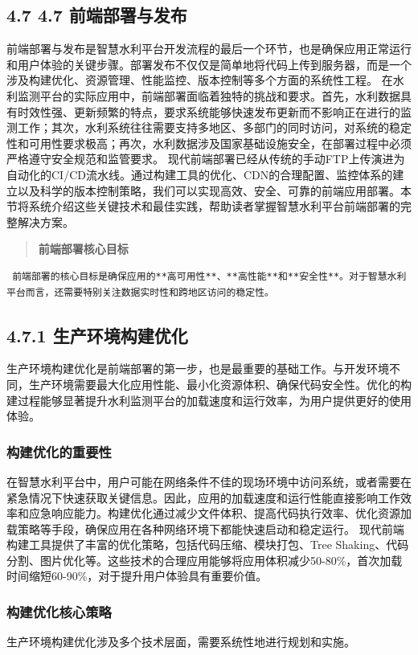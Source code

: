 \subsection{4.7 4.7 前端部署与发布}\label{ux524dux7aefux90e8ux7f72ux4e0eux53d1ux5e03} 前端部署与发布是智慧水利平台开发流程的最后一个环节，也是确保应用正常运行和用户体验的关键步骤。部署发布不仅仅是简单地将代码上传到服务器，而是一个涉及构建优化、资源管理、性能监控、版本控制等多个方面的系统性工程。 在水利监测平台的实际应用中，前端部署面临着独特的挑战和要求。首先，水利数据具有时效性强、更新频繁的特点，要求系统能够快速发布更新而不影响正在进行的监测工作；其次，水利系统往往需要支持多地区、多部门的同时访问，对系统的稳定性和可用性要求极高；再次，水利数据涉及国家基础设施安全，在部署过程中必须严格遵守安全规范和监管要求。 现代前端部署已经从传统的手动FTP上传演进为自动化的CI/CD流水线。通过构建工具的优化、CDN的合理配置、监控体系的建立以及科学的版本控制策略，我们可以实现高效、安全、可靠的前端应用部署。本节将系统介绍这些关键技术和最佳实践，帮助读者掌握智慧水利平台前端部署的完整解决方案。 \begin{quote} \textbf{前端部署核心目标} \end{quote} \begin{verbatim} 前端部署的核心目标是确保应用的**高可用性**、**高性能**和**安全性**。对于智慧水利平台而言，还需要特别关注数据实时性和跨地区访问的稳定性。 \end{verbatim} \subsection{4.7.1 生产环境构建优化}\label{ux751fux4ea7ux73afux5883ux6784ux5efaux4f18ux5316} 生产环境构建优化是前端部署的第一步，也是最重要的基础工作。与开发环境不同，生产环境需要最大化应用性能、最小化资源体积、确保代码安全性。优化的构建过程能够显著提升水利监测平台的加载速度和运行效率，为用户提供更好的使用体验。 \subsubsection{构建优化的重要性}\label{ux6784ux5efaux4f18ux5316ux7684ux91cdux8981ux6027} 在智慧水利平台中，用户可能在网络条件不佳的现场环境中访问系统，或者需要在紧急情况下快速获取关键信息。因此，应用的加载速度和运行性能直接影响工作效率和应急响应能力。构建优化通过减少文件体积、提高代码执行效率、优化资源加载策略等手段，确保应用在各种网络环境下都能快速启动和稳定运行。 现代前端构建工具提供了丰富的优化策略，包括代码压缩、模块打包、Tree Shaking、代码分割、图片优化等。这些技术的合理应用能够将应用体积减少50-80\%，首次加载时间缩短60-90\%，对于提升用户体验具有重要价值。 \subsubsection{构建优化核心策略}\label{ux6784ux5efaux4f18ux5316ux6838ux5fc3ux7b56ux7565} 生产环境构建优化涉及多个技术层面，需要系统性地进行规划和实施。 